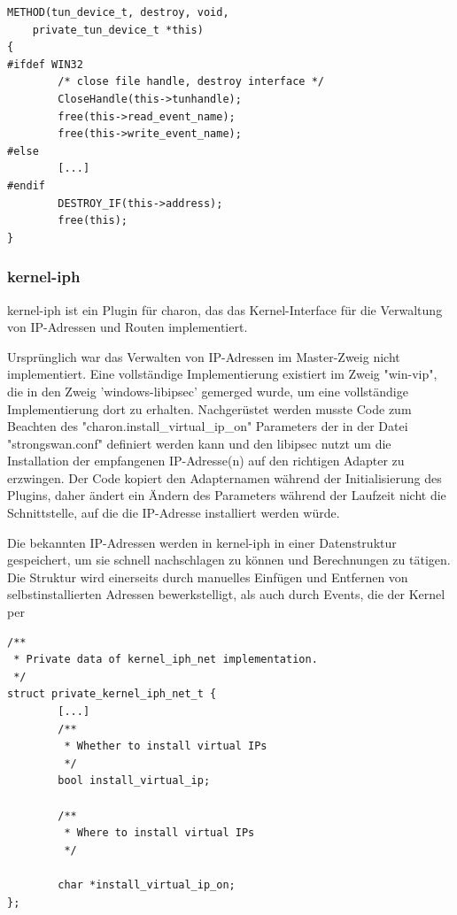 \begin{lstlisting}[caption=Relevanter code für tun\_device\_t->destroy()]
METHOD(tun_device_t, destroy, void,
	private_tun_device_t *this)
{
#ifdef WIN32
        /* close file handle, destroy interface */
        CloseHandle(this->tunhandle);
        free(this->read_event_name);
        free(this->write_event_name);
#else
        [...]
#endif
    	DESTROY_IF(this->address);
    	free(this);
}
\end{lstlisting}

\subsubsection{kernel-iph}
kernel-iph ist ein Plugin für charon, das das Kernel-Interface
für die Verwaltung von IP-Adressen und Routen implementiert.

Ursprünglich war das Verwalten von IP-Adressen im Master-Zweig nicht implementiert.
Eine vollständige Implementierung existiert im Zweig "win-vip", die in den Zweig 'windows-libipsec'
gemerged wurde, um eine vollständige Implementierung dort zu erhalten.
Nachgerüstet werden musste Code zum Beachten des "charon.install\_virtual\_ip\_on" Parameters
der in der Datei "strongswan.conf" definiert werden kann und den libipsec nutzt um
die Installation der empfangenen IP-Adresse(n) auf den richtigen Adapter zu erzwingen.
Der Code kopiert den Adapternamen während der Initialisierung des Plugins, daher
ändert ein Ändern des Parameters während der Laufzeit nicht die Schnittstelle,
auf die die IP-Adresse installiert werden würde.

Die bekannten IP-Adressen werden in kernel-iph in einer Datenstruktur gespeichert,
um sie schnell nachschlagen zu können und Berechnungen zu tätigen. Die Struktur
wird einerseits durch manuelles Einfügen und Entfernen von selbstinstallierten Adressen
bewerkstelligt, als auch durch Events, die der Kernel per 

\begin{lstlisting}[caption=Ergänzung zu private\_kernel\_iph\_net\_t]
/**
 * Private data of kernel_iph_net implementation.
 */
struct private_kernel_iph_net_t {
        [...]
        /**
         * Whether to install virtual IPs
         */
        bool install_virtual_ip;

        /**
         * Where to install virtual IPs
         */

        char *install_virtual_ip_on;
};
\end{lstlisting}

